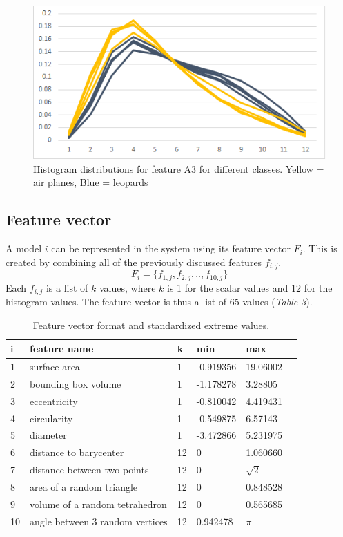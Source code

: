 \documentclass{bigdata}
\begin{document}
\begin{figure}[h!]
	\begin{center}
    \includegraphics[width=0.7\linewidth]{Pictures/Part3/A3.png}
    \caption{Histogram distributions for feature A3 for different classes. Yellow = air planes, Blue = leopards}
  \label{fig:eccentricity}
\end{center}
\end{figure}

\subsection{Feature vector}
A model $i$ can be represented in the system using its feature vector $F_i$. This is created by combining all of the previously discussed features $f_{i,j}$.
\begin{equation}
F_i = \{f_{1,j}, f_{2,j}, .. , f_{10,j}\}
\end{equation}
Each $f_{i,j}$ is a list of $k$ values, where $k$ is 1 for the scalar values and 12 for the histogram values. The feature vector is thus a list of 65 values (\textit{Table 3}).

\begin{table}[h!]
\begin{center}
\begin{tabular}
{ l | l | l | l | l | l}
i & feature name & k & min & max\\ \hline
1 & surface area & 1 & -0.919356 & 19.06002 \\
2 & bounding box volume & 1 & -1.178278 & 3.28805\\
3 & eccentricity & 1 & -0.810042 & 4.419431\\
4 & circularity & 1 & -0.549875 & 6.57143\\
5 & diameter & 1 & -3.472866 & 5.231975\\
6 & distance to barycenter & 12 & 0 & 1.060660\\
7 & distance between two points & 12 & 0 & $\sqrt{2}$\\
8 & area of a random triangle & 12 & 0 & 0.848528 \\
9 & volume of a random tetrahedron & 12 & 0 & 0.565685\\
10 & angle between 3 random vertices & 12 & 0.942478 & $\pi$\\
\end{tabular}
\end{center}
\caption{Feature vector format and standardized extreme values.}
\label{Table 3, }
\end{table}
\newpage
\end{document}
